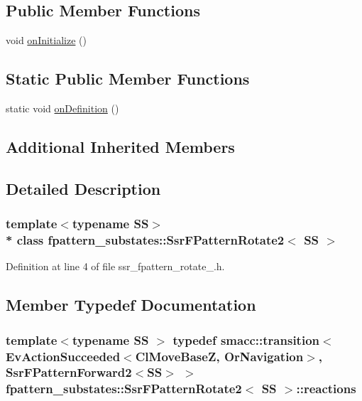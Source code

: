 \subsection*{Public Member Functions}
\begin{DoxyCompactItemize}
\item 
void \hyperlink{structfpattern__substates_1_1SsrFPatternRotate2_a22cd5162cc8313222bfb7260b38c18bd}{on\+Initialize} ()
\end{DoxyCompactItemize}
\subsection*{Static Public Member Functions}
\begin{DoxyCompactItemize}
\item 
static void \hyperlink{structfpattern__substates_1_1SsrFPatternRotate2_a60e36c89d07c502d91fd6a513bb0897b}{on\+Definition} ()
\end{DoxyCompactItemize}
\subsection*{Additional Inherited Members}


\subsection{Detailed Description}
\subsubsection*{template$<$typename SS$>$\\*
class fpattern\+\_\+substates\+::\+Ssr\+F\+Pattern\+Rotate2$<$ S\+S $>$}



Definition at line 4 of file ssr\+\_\+fpattern\+\_\+rotate\+\_.\+h.



\subsection{Member Typedef Documentation}
\subsubsection[{\texorpdfstring{reactions}{reactions}}]{\setlength{\rightskip}{0pt plus 5cm}template$<$typename SS $>$ typedef {\bf smacc\+::transition}$<$Ev\+Action\+Succeeded$<$Cl\+Move\+BaseZ, Or\+Navigation$>$, {\bf Ssr\+F\+Pattern\+Forward2}$<$SS$>$ $>$ {\bf fpattern\+\_\+substates\+::\+Ssr\+F\+Pattern\+Rotate2}$<$ SS $>$\+::{\bf reactions}}\hypertarget{structfpattern__substates_1_1SsrFPatternRotate2_a479f6de95a3970fad0f25c865abacaa6}{}\label{structfpattern__substates_1_1SsrFPatternRotate2_a479f6de95a3970fad0f25c865abacaa6}


